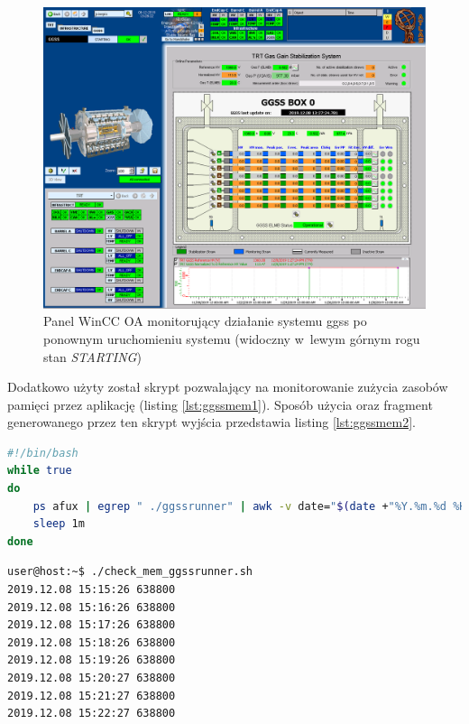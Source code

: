 \begin{figure}
\centering
\caption{Panel WinCC OA monitorujący działanie systemu \gls*{ggss} po ponownym uruchomieniu systemu (widoczny w~lewym górnym rogu stan \textit{STARTING})}
\label{fig:ggssafterstart}
\includegraphics[width=\textwidth]{res/png/ggssPoStarcie}
\end{figure}

\newpage
Dodatkowo użyty został skrypt pozwalający na monitorowanie zużycia zasobów pamięci przez aplikację (listing \ref{lst:ggssmem1}). Sposób użycia oraz fragment generowanego przez ten skrypt wyjścia przedstawia listing \ref{lst:ggssmem2}. 

\begin{lstlisting}[language=bash, caption={Skrypt \textit{check\_mem\_ggssrunner.sh} służacy do monitorowania pamięci używanej przez aplikację \textit{ggssrunner}}, label={lst:ggssmem1}]
#!/bin/bash
while true
do
    ps afux | egrep " ./ggssrunner" | awk -v date="$(date +"%Y.%m.%d %H:%M:%S")" '{print date, $5}'
    sleep 1m
done
\end{lstlisting}


\begin{lstlisting}[language=Cmd, caption={Wywołanie oraz fragment wyjścia skryptu \textit{check\_mem\_ggssrunner.sh} służacego do monitorowania pamięci używanej przez aplikację \textit{ggssrunner}}, label={lst:ggssmem2}]
user@host:~$ ./check_mem_ggssrunner.sh
2019.12.08 15:15:26 638800
2019.12.08 15:16:26 638800
2019.12.08 15:17:26 638800
2019.12.08 15:18:26 638800
2019.12.08 15:19:26 638800
2019.12.08 15:20:27 638800
2019.12.08 15:21:27 638800
2019.12.08 15:22:27 638800
\end{lstlisting}

